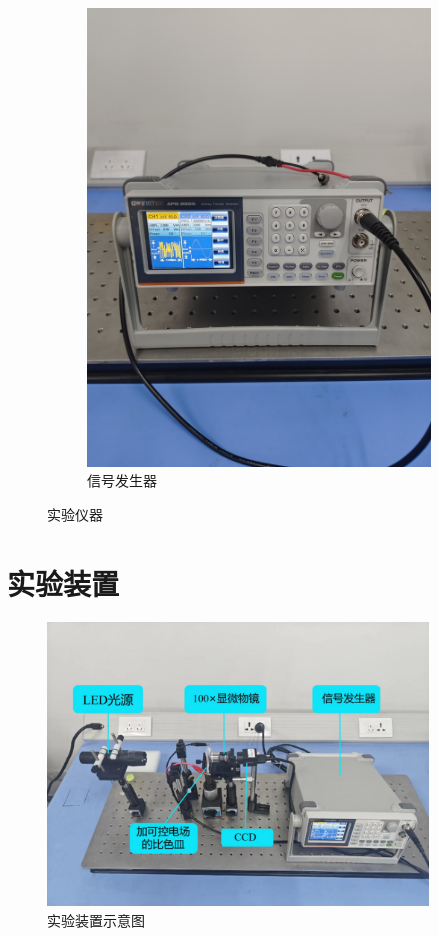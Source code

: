 \documentclass[a4paper]{report} %
\begin{document}
\begin{figure}[htbp]
\begin{subfigure}{0.22\textwidth}
        \includegraphics[width=\linewidth]{信号发生器.jpg}
        \caption{信号发生器}
    \end{subfigure}

    \caption{实验仪器}
\end{figure}

\section{实验装置}

\begin{figure}[H]
    \centering
    \includegraphics[width=0.9\textwidth]{完整实验装置.jpg}
    \caption{实验装置示意图}
    \label{fig:allsetup}
\end{figure}
\end{document}
